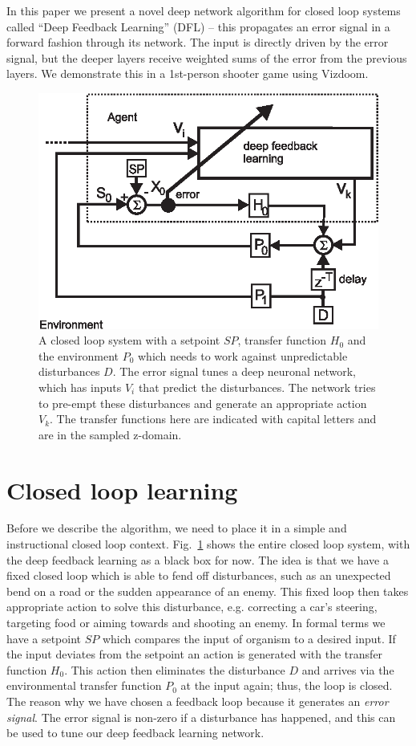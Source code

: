 \documentclass{article}
\begin{document}
In this paper we present a novel deep network algorithm for closed
loop systems called ``Deep Feedback Learning'' (DFL) -- this
propagates an error signal in a forward fashion through its
network. The input is directly driven by the error signal, but the
deeper layers receive weighted sums of the error from the previous
layers.  We demonstrate this in a 1st-person shooter game using
Vizdoom.

\begin{figure}[!ht]
  \centering
  \includegraphics[width=0.75\columnwidth]{closed_loop}
  \caption{A closed loop system with a setpoint $SP$, transfer
    function $H_0$ and the environment $P_0$ which needs to work
    against unpredictable disturbances $D$.  The error signal tunes a
    deep neuronal network, which has inputs $V_i$ that predict the
    disturbances. The network tries to pre-empt these disturbances and
    generate an appropriate action $V_k$. The transfer functions here
    are indicated with capital letters and are in the sampled
    z-domain.
    \label{closed_loop}}
\end{figure}

\section{Closed loop learning}
Before we describe the algorithm, we need to place it in a simple and
instructional closed loop context. Fig.~\ref{closed_loop} shows the
entire closed loop system, with the deep feedback learning as a black
box for now. The idea is that we have a fixed closed loop which is
able to fend off disturbances, such as an unexpected bend on a road or
the sudden appearance of an enemy. This fixed loop then takes
appropriate action to solve this disturbance, e.g. correcting a car's
steering, targeting food or aiming towards and shooting an enemy. In
formal terms we have a setpoint $SP$ which compares the input of
organism to a desired input. If the input deviates from the setpoint
an action is generated with the transfer function $H_0$. This action
then eliminates the disturbance $D$ and arrives via the environmental
transfer function $P_0$ at the input again; thus, the loop is
closed. The reason why we have chosen a feedback loop because it
generates an \textsl{error signal}. The error signal is
non-zero if a disturbance has happened, and this can be used to tune
our deep feedback learning network.
\end{document}
